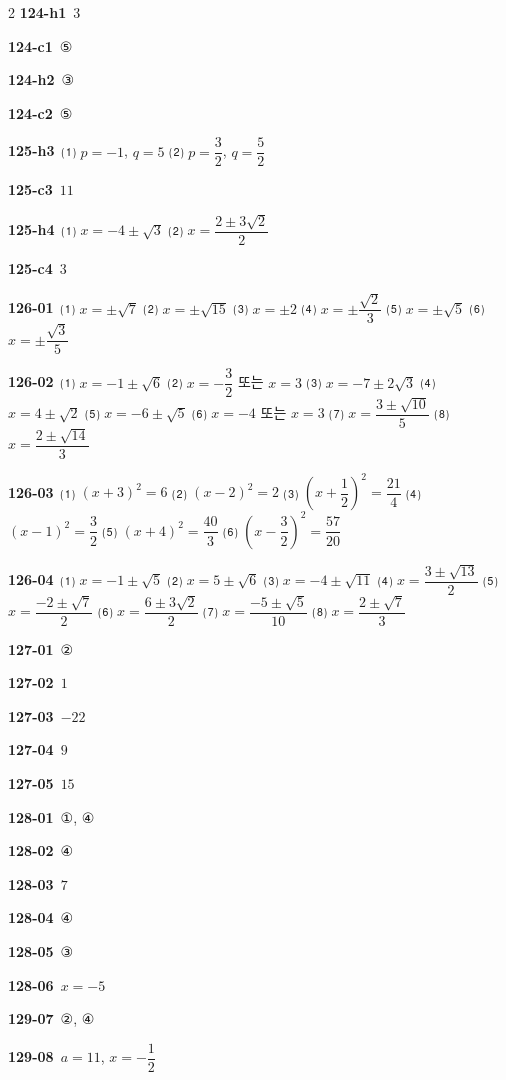 \documentclass[10pt,a4paper]{article}
\begin{document}
\begin{multicols}{2}
\noindent\textbf{124-h1}\ $3$\par
\noindent\textbf{124-c1}\ ⑤\par
\noindent\textbf{124-h2}\ ③\par
\noindent\textbf{124-c2}\ ⑤\par
\noindent\textbf{125-h3}\ ⑴ $p=-1$, $q=5$ ⑵ $p=\dfrac{3}{2}$, $q=\dfrac{5}{2}$\par
\noindent\textbf{125-c3}\ $11$\par
\noindent\textbf{125-h4}\ ⑴ $x=-4\pm\sqrt{3}$ ⑵ $x=\dfrac{2\pm3\sqrt{2}}{2}$\par
\noindent\textbf{125-c4}\ $3$\par
\noindent\textbf{126-01}\ ⑴ $x=\pm\sqrt{7}$ ⑵ $x=\pm\sqrt{15}$ ⑶ $x=\pm2$ ⑷ $x=\pm\dfrac{\sqrt{2}}{3}$ ⑸ $x=\pm\sqrt{5}$ ⑹ $x=\pm\dfrac{\sqrt{3}}{5}$\par
\noindent\textbf{126-02}\ ⑴ $x=-1\pm\sqrt{6}$ ⑵ $x=-\dfrac{3}{2}$ 또는 $x=3$ ⑶ $x=-7\pm2\sqrt{3}$ ⑷ $x=4\pm\sqrt{2}$ ⑸ $x=-6\pm\sqrt{5}$ ⑹ $x=-4$ 또는 $x=3$ ⑺ $x=\dfrac{3\pm\sqrt{10}}{5}$ ⑻ $x=\dfrac{2\pm\sqrt{14}}{3}$\par
\noindent\textbf{126-03}\ ⑴ $(x+3)^2=6$ ⑵ $(x-2)^2=2$ ⑶ $\left(x+\dfrac{1}{2}\right)^2=\dfrac{21}{4}$ ⑷ $(x-1)^2=\dfrac{3}{2}$ ⑸ $(x+4)^2=\dfrac{40}{3}$ ⑹ $\left(x-\dfrac{3}{2}\right)^2=\dfrac{57}{20}$\par
\noindent\textbf{126-04}\ ⑴ $x=-1\pm\sqrt{5}$ ⑵ $x=5\pm\sqrt{6}$ ⑶ $x=-4\pm\sqrt{11}$ ⑷ $x=\dfrac{3\pm\sqrt{13}}{2}$ ⑸ $x=\dfrac{-2\pm\sqrt{7}}{2}$ ⑹ $x=\dfrac{6\pm3\sqrt{2}}{2}$ ⑺ $x=\dfrac{-5\pm\sqrt{5}}{10}$ ⑻ $x=\dfrac{2\pm\sqrt{7}}{3}$\par
\noindent\textbf{127-01}\ ②\par
\noindent\textbf{127-02}\ $1$\par
\noindent\textbf{127-03}\ $-22$\par
\noindent\textbf{127-04}\ $9$\par
\noindent\textbf{127-05}\ $15$\par
\noindent\textbf{128-01}\ ①, ④\par
\noindent\textbf{128-02}\ ④\par
\noindent\textbf{128-03}\ $7$\par
\noindent\textbf{128-04}\ ④\par
\noindent\textbf{128-05}\ ③\par
\noindent\textbf{128-06}\ $x=-5$\par
\noindent\textbf{129-07}\ ②, ④\par
\noindent\textbf{129-08}\ $a=11$, $x=-\dfrac{1}{2}$\par

\end{multicols}
\end{document}
